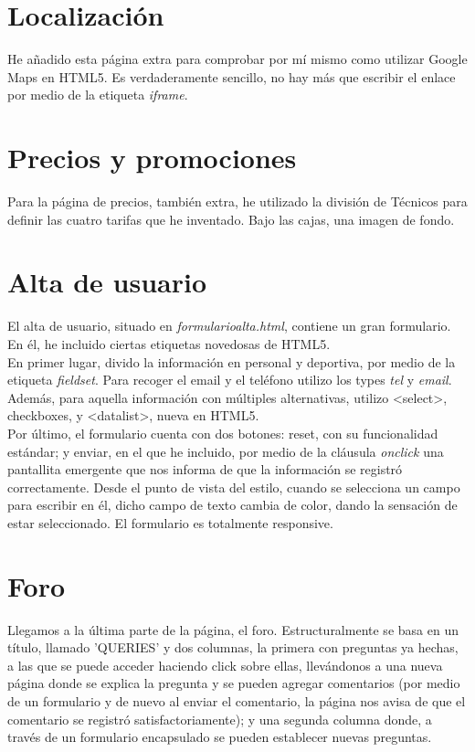 \section{Localización}

He añadido esta página extra para comprobar por mí mismo como utilizar Google Maps en HTML5. Es verdaderamente sencillo, no hay más que escribir el enlace por medio de la etiqueta \textit{iframe}.

\section{Precios y promociones}


Para la página de precios, también extra, he utilizado la división de Técnicos para definir las cuatro tarifas que he inventado. Bajo las cajas, una imagen de fondo. 

\section{Alta de usuario}

El alta de usuario, situado en \textit{formularioalta.html}, contiene un gran formulario. En él, he incluido ciertas etiquetas novedosas de HTML5. \\
En primer lugar, divido la información en personal y deportiva, por medio de la etiqueta \textit{fieldset}. Para recoger el email y el teléfono utilizo los types \textit{tel} y \textit{email}. Además, para aquella información con múltiples alternativas, utilizo <select>, checkboxes, y <datalist>, nueva en HTML5. \\

Por último, el formulario cuenta con dos botones: reset, con su funcionalidad estándar; y enviar, en el que he incluido, por medio de la cláusula \textit{onclick} una pantallita emergente que nos informa de que la información se registró correctamente. Desde el punto de vista del estilo, cuando se selecciona un campo para escribir en él, dicho campo de texto cambia de color, dando la sensación de estar seleccionado. El formulario es totalmente responsive.

\section{Foro}

Llegamos a la última parte de la página, el foro. Estructuralmente se basa en un título, llamado 'QUERIES' y dos columnas, la primera con preguntas ya hechas, a las que se puede acceder haciendo click sobre ellas, llevándonos a una nueva página donde se explica la pregunta y se pueden agregar comentarios (por medio de un formulario y de nuevo al enviar el comentario, la página nos avisa de que el comentario se registró satisfactoriamente); y una segunda columna donde, a través de un formulario encapsulado se pueden establecer nuevas preguntas. \\

